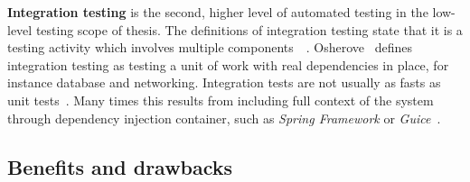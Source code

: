     \textbf{Integration testing} is the second, higher level of automated testing in the low-level testing scope of thesis.
    The definitions of integration testing state that it is a testing
    activity which involves multiple components~\cite{whittaker2000software}~\cite{artofunit2013}. Osherove~\cite{artofunit2013}
    defines integration testing as testing a unit of work with real dependencies in place, for instance database and  networking.
    Integration tests are not usually as fasts as unit tests~\cite{artofunit2013}. Many times this results from including
    full context of the system through dependency injection container, such as \textit{Spring Framework} or \textit{Guice}~\cite{kapelonis2016java}.

    \subsection{Benefits and drawbacks}

